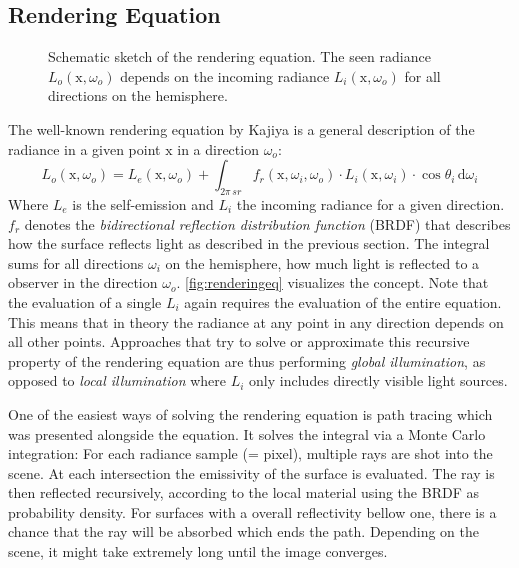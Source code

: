 \documentclass[thesis.tex]{subfiles}
\begin{document}
\subsection{Rendering Equation}
\begin{figure}[h]
\centering
{}
\caption{Schematic sketch of the rendering equation. The seen radiance $L_o(\mathrm{x}, \omega_o)$ depends on the incoming radiance $L_i(\mathrm{x}, \omega_o)$ for all directions on the hemisphere.}
\label{fig:renderingeq}
\end{figure}
The well-known rendering equation by Kajiya \cite{bib:renderingequation} is a general description of the radiance in a given point $\mathrm{x}$ in a direction $\omega_o$:
\begin{equation}
L_o(\mathrm{x}, \omega_o) = L_e(\mathrm{x}, \omega_o) + \int_{2\pi\,sr} f_r(\mathrm{x}, \omega_i, \omega_o) \cdot L_i(\mathrm{x}, \omega_i) \cdot \cos\theta_i \, \mathrm{d}\omega_i
\end{equation}
Where $L_e$ is the self-emission and $L_i$ the incoming radiance for a given direction.
$f_r$ denotes the \emph{bidirectional reflection distribution function} (BRDF) that describes how the surface reflects light as described in the previous section.
The integral sums for all directions $\omega_i$ on the hemisphere, how much light is reflected to a observer in the direction $\omega_o$.
\autoref{fig:renderingeq} visualizes the concept.
Note that the evaluation of a single $L_i$ again requires the evaluation of the entire equation.
This means that in theory the radiance at any point in any direction depends on all other points.
Approaches that try to solve or approximate this recursive property of the rendering equation are thus performing \emph{global illumination}, as opposed to \emph{local illumination} where $L_i$ only includes directly visible light sources.

One of the easiest ways of solving the rendering equation is path tracing which was presented alongside the equation.
It solves the integral via a Monte Carlo integration:
For each radiance sample (= pixel), multiple rays are shot into the scene.
At each intersection the emissivity of the surface is evaluated. 
The ray is then reflected recursively, according to the local material using the BRDF as probability density.
For surfaces with a overall reflectivity bellow one, there is a chance that the ray will be absorbed which ends the path.
Depending on the scene, it might take extremely long until the image converges.
\end{document}
